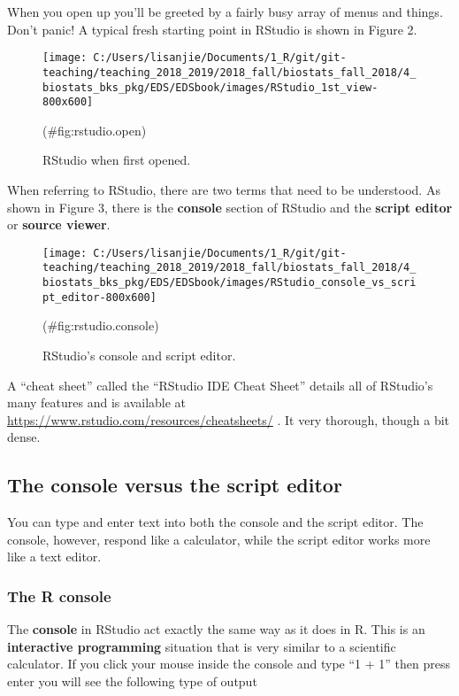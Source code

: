 \documentclass[]{book}
\theoremstyle{definition}
\theoremstyle{definition}
\theoremstyle{definition}
\theoremstyle{remark}
\begin{document}
When you open up you'll be greeted by a fairly busy array of menus and
things. Don't panic! A typical fresh starting point in RStudio is shown
in Figure 2.

\begin{figure}
\texttt{[image: C:/Users/lisanjie/Documents/1\_R/git/git-teaching/teaching\_2018\_2019/2018\_fall/biostats\_fall\_2018/4\_biostats\_bks\_pkg/EDS/EDSbook/images/RStudio\_1st\_view-800x600]} \caption{RStudio when first opened.}(\#fig:rstudio.open)
\end{figure}

When referring to RStudio, there are two terms that need to be
understood. As shown in Figure 3, there is the \textbf{console} section
of RStudio and the \textbf{script editor} or \textbf{source viewer}.

\begin{figure}
\texttt{[image: C:/Users/lisanjie/Documents/1\_R/git/git-teaching/teaching\_2018\_2019/2018\_fall/biostats\_fall\_2018/4\_biostats\_bks\_pkg/EDS/EDSbook/images/RStudio\_console\_vs\_script\_editor-800x600]} \caption{RStudio's console and script editor.}(\#fig:rstudio.console)
\end{figure}

A ``cheat sheet'' called the ``RStudio IDE Cheat Sheet'' details all of
RStudio's many features and is available at
\url{https://www.rstudio.com/resources/cheatsheets/} . It very thorough,
though a bit dense.

\subsection{The console versus the script
editor}\label{the-console-versus-the-script-editor}

You can type and enter text into both the console and the script editor.
The console, however, respond like a calculator, while the script editor
works more like a text editor.

\subsubsection{The R console}\label{the-r-console}

The \textbf{console} in RStudio act exactly the same way as it does in
R. This is an \textbf{interactive programming} situation that is very
similar to a scientific calculator. If you click your mouse inside the
console and type ``1 + 1'' then press enter you will see the following
type of output
\end{document}
